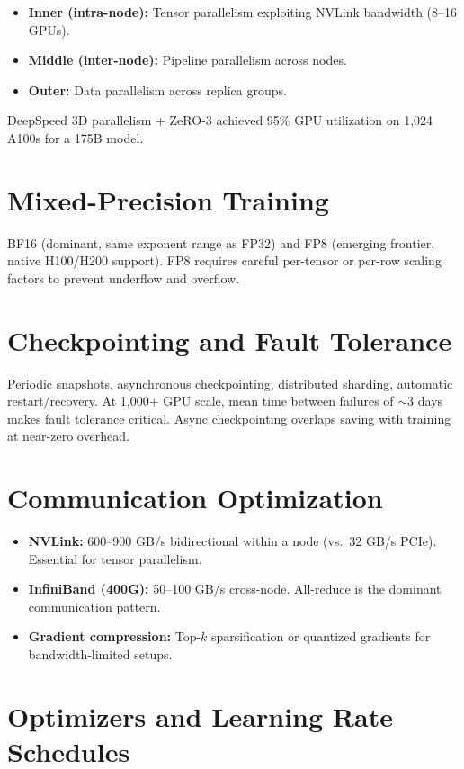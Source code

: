 \begin{itemize}
  \item \textbf{Inner (intra-node):} Tensor parallelism exploiting NVLink bandwidth (8--16 GPUs).
  \item \textbf{Middle (inter-node):} Pipeline parallelism across nodes.
  \item \textbf{Outer:} Data parallelism across replica groups.
\end{itemize}

DeepSpeed 3D parallelism + ZeRO-3 achieved 95\% GPU utilization on 1,024 A100s for a 175B model.

\section{Mixed-Precision Training}

BF16 (dominant, same exponent range as FP32) and FP8 (emerging frontier, native H100/H200 support). FP8 requires careful per-tensor or per-row scaling factors to prevent underflow and overflow.

\section{Checkpointing and Fault Tolerance}

Periodic snapshots, asynchronous checkpointing, distributed sharding, automatic restart/recovery. At 1,000+ GPU scale, mean time between failures of $\sim$3 days makes fault tolerance critical. Async checkpointing overlaps saving with training at near-zero overhead.

\section{Communication Optimization}

\begin{itemize}
  \item \textbf{NVLink:} 600--900 GB/s bidirectional within a node (vs.\ 32 GB/s PCIe). Essential for tensor parallelism.
  \item \textbf{InfiniBand (400G):} 50--100 GB/s cross-node. All-reduce is the dominant communication pattern.
  \item \textbf{Gradient compression:} Top-$k$ sparsification or quantized gradients for bandwidth-limited setups.
\end{itemize}

\section{Optimizers and Learning Rate Schedules}


